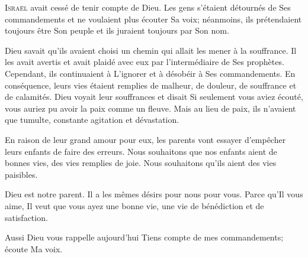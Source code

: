 
\lettrine{I}{sraël} avait cessé de tenir compte de Dieu.
 Les gens s'étaient détournés de Ses commandements
 et ne voulaient plus écouter Sa voix; néanmoins, 
 ils prétendaient toujours être Son peuple
 et ils juraient toujours par Son nom. 

Dieu savait qu'ils avaient choisi un chemin
 qui allait les mener à la souffrance.
 Il les avait avertis et avait plaidé avec eux
 par l'intermédiaire de Ses prophètes.
 Cependant, ils continuaient à L'ignorer et à désobéir
 à Ses commandements. En conséquence,
 leurs vies étaient remplies de malheur, de douleur,
 de souffrance et de calamités.
 Dieu voyait leur souffrances et disait\frcolon{} 
 \Og Si seulement vous aviez écouté, vous auriez pu avoir la paix
 comme un fleuve. \Fg{} 
 Mais au lieu de paix, ils n'avaient que tumulte,
 constante agitation et dévastation. 


En raison de leur grand amour pour eux,
 les parents vont essayer d'empêcher leurs enfants de faire des erreurs.
 Nous souhaitons que nos enfants aient de bonnes vies,
 des vies remplies de joie.
 Nous souhaitons qu'ils 
 aient des vies paisibles. 

Dieu est notre parent. Il a les mêmes désirs pour nous \ocadr pour vous.
 Parce qu'Il vous aime, Il veut que vous ayez une bonne vie,
 une vie de bénédiction et de satisfaction. 

Aussi Dieu vous rappelle aujourd'hui\frcolon{} 
 \Og Tiens compte de mes commandements; écoute Ma voix. \Fg{}

\dvrule







